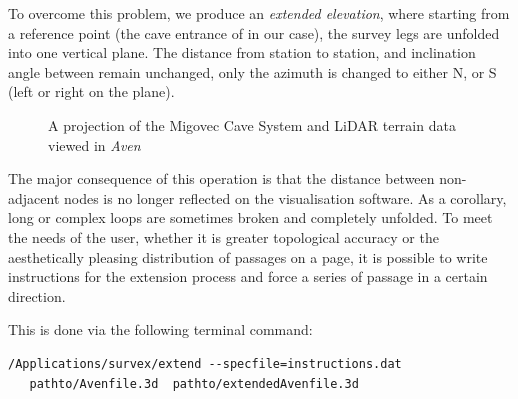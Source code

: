 To overcome this problem, we produce an \emph{extended elevation}, where starting from a reference point (the cave entrance of  in our case), the survey legs are unfolded into one vertical plane. The distance from station to station, and inclination angle between remain unchanged, only the azimuth is changed to either N, or S (left or right on the plane). 


\begin{figure}[t!]
 \checkoddpage \ifoddpage \forcerectofloat \else \forceversofloat \fi
\centering
{}
\caption{A projection of the Migovec Cave System and LiDAR terrain data viewed in \emph{Aven}}
\label{projection}
\end{figure}


\begin{marginfigure}
 \checkoddpage \ifoddpage \forcerectofloat \else \forceversofloat \fi
 \centering
\end{marginfigure}

The major consequence of this operation is that the distance between non-adjacent nodes is no longer reflected on the visualisation software. As a corollary, long or complex loops are sometimes broken and completely unfolded. To meet the needs of the user, whether it is greater topological accuracy or the aesthetically pleasing distribution of passages on a page, it is possible to write instructions for the extension process and force a series of passage in a certain direction.

 

This is done via the following terminal command:
\begin{verbatim}
/Applications/survex/extend --specfile=instructions.dat 
   pathto/Avenfile.3d  pathto/extendedAvenfile.3d
\end{verbatim}

